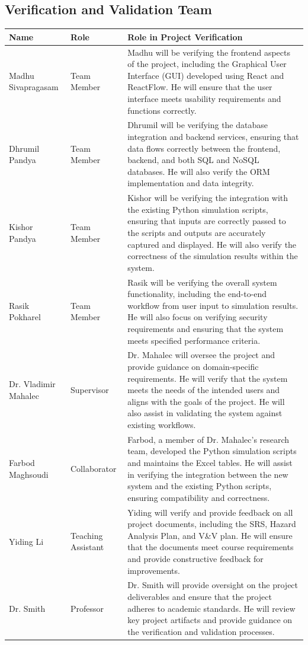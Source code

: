 \documentclass[12pt, titlepage]{article}
\begin{document}
\subsection{Verification and Validation Team}

\begin{longtable}{|>{\raggedright\arraybackslash}p{4cm}|>{\raggedright\arraybackslash}p{3cm}|>{\raggedright\arraybackslash}p{8cm}|}
  \hline
  \textbf{Name} & \textbf{Role} & \textbf{Role in Project Verification} \\
  \hline
  Madhu Sivapragasam & Team Member & Madhu will be verifying the frontend aspects of the project, including the Graphical User Interface (GUI) developed using React and ReactFlow. He will ensure that the user interface meets usability requirements and functions correctly. \\
  \hline
  Dhrumil Pandya & Team Member & Dhrumil will be verifying the database integration and backend services, ensuring that data flows correctly between the frontend, backend, and both SQL and NoSQL databases. He will also verify the ORM implementation and data integrity. \\
  \hline
  Kishor Pandya & Team Member & Kishor will be verifying the integration with the existing Python simulation scripts, ensuring that inputs are correctly passed to the scripts and outputs are accurately captured and displayed. He will also verify the correctness of the simulation results within the system. \\
  \hline
  Rasik Pokharel & Team Member & Rasik will be verifying the overall system functionality, including the end-to-end workflow from user input to simulation results. He will also focus on verifying security requirements and ensuring that the system meets specified performance criteria. \\
  \hline
  Dr. Vladimir Mahalec & Supervisor & Dr. Mahalec will oversee the project and provide guidance on domain-specific requirements. He will verify that the system meets the needs of the intended users and aligns with the goals of the project. He will also assist in validating the system against existing workflows. \\
  \hline
  Farbod Maghsoudi &	Collaborator &	Farbod, a member of Dr. Mahalec's research team, developed the Python simulation scripts and maintains the Excel tables. He will assist in verifying the integration between the new system and the existing Python scripts, ensuring compatibility and correctness.\\
  \hline
  Yiding Li	& Teaching Assistant & Yiding will verify and provide feedback on all project documents, including the SRS, Hazard Analysis Plan, and V\&V plan. He will ensure that the documents meet course requirements and provide constructive feedback for improvements.\\
  \hline
  Dr. Smith	& Professor	& Dr. Smith will provide oversight on the project deliverables and ensure that the project adheres to academic standards. He will review key project artifacts and provide guidance on the verification and validation processes.\\
  \hline
  \end{longtable}
\end{document}
